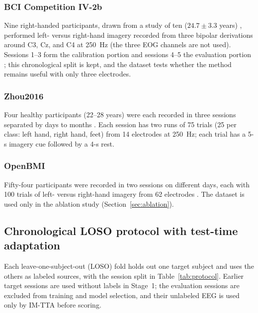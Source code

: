 \documentclass[preprint,12pt]{elsarticle}
\begin{document}
\subsubsection{BCI Competition IV-2b}
\label{subsec:bcic2b}

Nine right-handed participants, drawn from a study of ten ($24.7\pm3.3$ years) \cite{leeb2007virtual}, performed left- versus right-hand imagery recorded from three bipolar derivations around C3, Cz, and C4 at 250~Hz (the three EOG channels are not used). Sessions 1--3 form the calibration portion and sessions 4--5 the evaluation portion \cite{tangermann2012review}; this chronological split is kept, and the dataset tests whether the method remains useful with only three electrodes.

\subsubsection{Zhou2016}
\label{subsec:zhou2016}

Four healthy participants (22--28 years) were each recorded in three sessions separated by days to months \cite{zhou2016trialselection}. Each session has two runs of 75 trials (25 per class: left hand, right hand, feet) from 14 electrodes at 250~Hz; each trial has a 5-s imagery cue followed by a 4-s rest.

\subsubsection{OpenBMI}
\label{subsec:openbmi}

Fifty-four participants were recorded in two sessions on different days, each with 100 trials of left- versus right-hand imagery from 62 electrodes \cite{lee2019openbmi}. The dataset is used only in the ablation study (Section~\ref{sec:ablation}).

\subsection{Chronological LOSO protocol with test-time adaptation}
\label{subsec:clean_protocol}

Each leave-one-subject-out (LOSO) fold holds out one target subject and uses the others as labeled sources, with the session split in Table~\ref{tab:protocol}. Earlier target sessions are used without labels in Stage~1; the evaluation sessions are excluded from training and model selection, and their unlabeled EEG is used only by IM-TTA before scoring.
\end{document}

